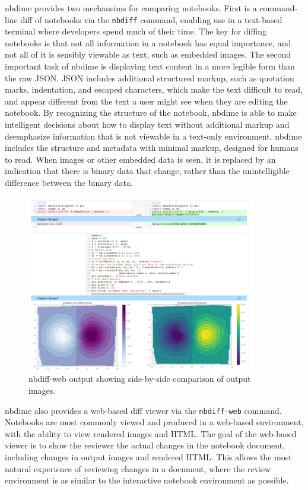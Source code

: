\documentclass{deliverablereport}
\begin{document}
nbdime provides two mechansims for comparing notebooks. First is a command-line diff of notebooks
via the \texttt{nbdiff} command, enabling use in a text-based terminal where developers spend much
of their time. The key for diffing notebooks is that not all information in a notebook has equal
importance, and not all of it is sensibly viewable as text, such as embedded images. The second
important task of nbdime is displaying text content in a more legible form than the raw JSON. JSON
includes additional structured markup, such as quotation marks, indentation, and escaped
characters, which make the text difficult to read, and appear different from the text a user might
see when they are editing the notebook. By recognizing the structure of the notebook, nbdime is
able to make intelligent decisions about how to display text without additional markup and deemphasize information that is not viewable in a text-only environment.
nbdime includes the structure and metadata with minimal markup, designed for humans to read.
When images or other embedded data is seen, it is replaced by an indication that there is binary data that change, rather than the unintelligible difference between the binary data.

\begin{figure}
    \center
    \includegraphics[width=10cm]{img/nbdiff-web}
    \caption{nbdiff-web output showing side-by-side comparison of output images.}
    \label{fig:nbdiff-web}
\end{figure}

nbdime also provides a web-based diff viewer via the \texttt{nbdiff-web} command. Notebooks are
most commonly viewed and produced in a web-based environment, with the ability to view rendered
images and HTML. The goal of the web-based viewer is to show the reviewer the actual changes in the
notebook document, including changes in output images and rendered HTML.
This allows the most natural experience of reviewing changes in a document, where the review environment is as similar to the interactive notebook environment as possible.
\end{document}
